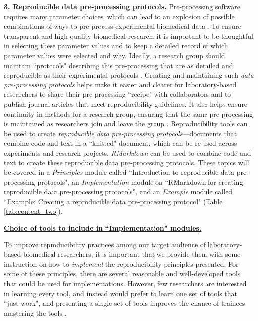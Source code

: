 \documentclass[pdftex,english,11.5pt,parskip=half]{scrartcl}
\begin{document}
\textbf{3. Reproducible data pre-processing protocols.} Pre-processing software requires many parameter choices, which can lead to an explosion of possible combinations of ways to pre-process experimental biomedical data \cite{munafo2017manifesto, shade2015computing, pernet2015improving}. To ensure transparent and high-quality biomedical research, it is important to be thoughtful in selecting these parameter values and to keep a detailed record of which parameter values were selected and why. Ideally, a research group should maintain ``protocols" describing this pre-processing that are as detailed and reproducible as their experimental protocols  \cite{gentleman2004bioconductor}. Creating and maintaining such \textit{data pre-processing protocols} helps make it easier and clearer for laboratory-based researchers to share their pre-processing ``recipe" with collaborators and to publish journal articles that meet reproducibility guidelines. It also helps ensure continuity in methods for a research group, ensuring that the same pre-processing is maintained as researchers join and leave the group \cite{shade2015computing}.
Reproducibility tools can be used to create \textit{reproducible data pre-processing protocols}---documents that combine code and text in a ``knitted" document, which can be re-used across experiments and research projects. \textit{RMarkdown} can be used to combine code and text to create these reproducible data pre-processing protocols. These topics will be covered in a \textit{Principles} module called ``Introduction to reproducible data pre-processing protocols", an \textit{Implementation} module on ``RMarkdown
for creating reproducible data pre-processing protocols", and an
\textit{Example} module called ``Example: Creating a reproducible data
pre-processing protocol" (Table \ref*{tab:content_two}). 

\underline{\textbf{Choice of tools to include in ``Implementation" modules.}}

To improve reproducibility practices among our target audience of laboratory-based biomedical researchers, it is important
that we provide them with some instruction on how to \textit{implement} the
reproducibility principles presented. For some of these principles, there are
several reasonable and well-developed tools that could be used for
implementations. However, few researchers are interested in learning every tool,
and instead would prefer to learn one set of tools that ``just work", and presenting a single set of tools improves the chance of trainees mastering the tools \cite{brown2018ten}. 
\end{document}
